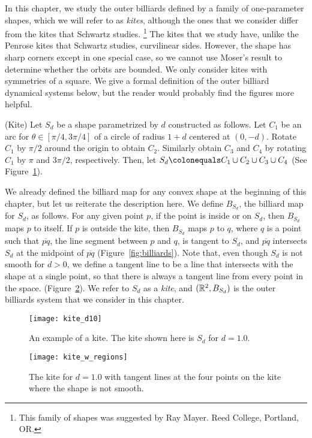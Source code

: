 \documentclass[10pt,twoside]{book}
\begin{document}
In this chapter, we study the outer billiards defined by a family of one-parameter shapes, which we will refer to as \textit{kites}, although the ones that we consider differ from the kites that Schwartz studies.
\footnote{This family of shapes was suggested by Ray Mayer. Reed College, Portland, OR.}
The kites that we study have, unlike the Penrose kites that Schwartz studies, curvilinear sides.
However, the shape has sharp corners except in one special case, so we cannot use Moser's result to determine whether the orbits are bounded.
We only consider kites with symmetries of a square.
We give a formal definition of the outer billiard dynamical systems below, but the reader would probably find the figures more helpful.
\begin{definition}
  (Kite)
  Let $S_d$ be a shape parametrized by $d$ constructed as follows.
  Let $C_1$ be an arc for $\theta \in [\pi/4, 3\pi/4]$ of a circle of radius $1+d$ centered at $(0,-d)$.
  Rotate $C_1$ by $\pi/2$ around the origin to obtain $C_2$.
  Similarly obtain $C_3$ and $C_4$ by rotating $C_1$ by $\pi$ and $3\pi/2$, respectively.
  Then, let $S_d \ceq C_1 \cup C_2 \cup C_3 \cup C_4$ (See Figure~\ref{fig:kiteeg}).

  We already defined the billiard map for any convex shape at the beginning of this chapter, but let us reiterate the description here.
  We define $B_{S_d}$, the billiard map for $S_d$, as follows.
  For any given point $p$, if the point is inside or on $S_d$, then $B_{S_d}$ maps $p$ to itself.
  If $p$ is outside the kite, then $B_{S_d}$ maps $p$ to $q$, where $q$ is a point such that $\overline{pq}$, the line segment between $p$ and $q$, is tangent to $S_d$, and $\overline{pq}$ intersects $S_d$ at the midpoint of $\overline{pq}$ (Figure~\ref{fig:billiards}).
  Note that, even though $S_d$ is not smooth for $d > 0$, we define a tangent line to be a line that intersects with the shape at a single point, so that there is always a tangent line from every point in the space. 
  (Figure~\ref{fig:kite-regions}).
  We refer to $S_d$ as a \textit{kite}, and $(\mathbb{R}^2, B_{S_d})$ is the outer billiards system that we consider in this chapter.

\end{definition}
\begin{figure}[ht]
  \begin{center}
    \texttt{[image: kite\_d10]}
    \caption{An example of a kite. The kite shown here is $S_d$ for $d = 1.0$.}
    \label{fig:kiteeg}
  \end{center}
\end{figure}
\begin{figure}[ht]
  \begin{center}
    \texttt{[image: kite\_w\_regions]}
    \caption{The kite for $d = 1.0$ with tangent lines at the four points on the kite where the shape is not smooth.}
    \label{fig:kite-regions}
  \end{center}
\end{figure}
\end{document}

